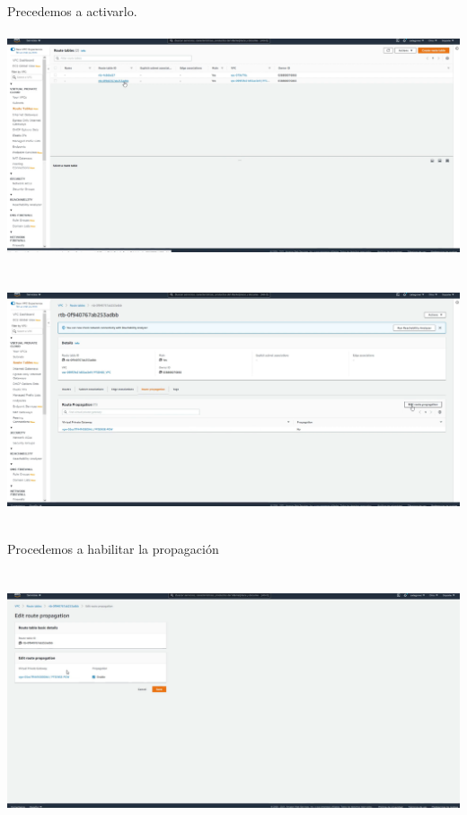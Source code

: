 \documentclass{article} %
\begin{document}
\noindent 

\noindent Precedemos a activarlo. 

\noindent 

\noindent \includegraphics*[width=6.21in, height=2.62in, trim=0.00in 0.97in 1.32in 0.00in]{image13}

\noindent 

\noindent 

\noindent 

\noindent \includegraphics*[width=6.70in, height=2.88in, trim=0.02in 0.25in 0.10in 0.10in]{image14}

\noindent 

\noindent Procedemos a habilitar la propagaci\'{o}n

\noindent 

\noindent 

\noindent \includegraphics*[width=6.61in, height=3.02in, trim=0.00in 0.76in 1.34in 0.00in]{image15}
\end{document}

